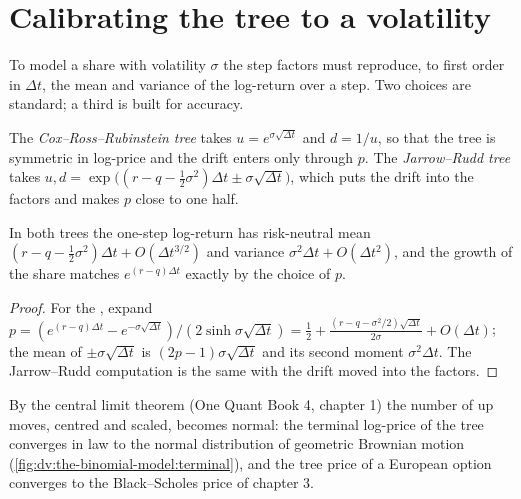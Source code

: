 \section{Calibrating the tree to a volatility}

To model a share with volatility $\sigma$ the step factors must reproduce, to first
order in $\Delta t$, the mean and variance of the log-return over a step. Two
choices are standard; a third is built for accuracy.

\begin{definition}\label{def:dv:the-binomial-model:crr}
The \emph{Cox--Ross--Rubinstein tree} takes
$u=e^{\sigma\sqrt{\Delta t}}$ and $d=1/u$, so that the tree is symmetric in
log-price and the drift enters only through $p$. The \emph{Jarrow--Rudd
tree} takes
$u,d=\exp\bigl((r-q-\tfrac12\sigma^2)\Delta t\pm\sigma\sqrt{\Delta t}\bigr)$, which
puts the drift into the factors and makes $p$ close to one half.
\end{definition}

\begin{proposition}\label{prop:dv:the-binomial-model:moments}
In both trees the one-step log-return has risk-neutral mean
$(r-q-\tfrac12\sigma^2)\Delta t+O(\Delta t^{3/2})$ and variance
$\sigma^2\Delta t+O(\Delta t^2)$, and the growth of the share matches
$e^{(r-q)\Delta t}$ exactly by the choice of $p$.
\end{proposition}
\begin{proof}
For the , expand
$p=(e^{(r-q)\Delta t}-e^{-\sigma\sqrt{\Delta t}})/(2\sinh\sigma\sqrt{\Delta t})=
\tfrac12+\tfrac{(r-q-\sigma^2/2)\sqrt{\Delta t}}{2\sigma}+O(\Delta t)$; the mean of
$\pm\sigma\sqrt{\Delta t}$ is $(2p-1)\sigma\sqrt{\Delta t}$ and its second moment
$\sigma^2\Delta t$. The Jarrow--Rudd computation is the same with the drift
moved into the factors.
\end{proof}

By the central limit theorem (One Quant Book 4, chapter 1) the number of up moves,
centred and scaled, becomes normal: the terminal log-price of the tree converges
in law to the normal distribution of geometric Brownian motion
(\cref{fig:dv:the-binomial-model:terminal}), and the tree price of a European
option converges to the Black--Scholes price of chapter 3.

